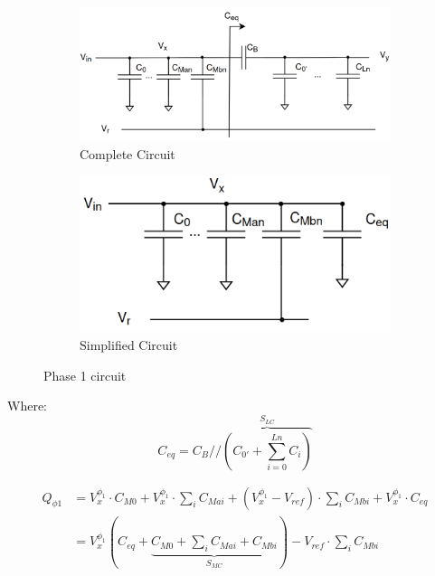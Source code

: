 \begin{figure}[H]

    \centering
    \begin{subfigure}{0.4\textwidth}
        \includegraphics*[scale = 0.17]{Images/DACCircP1.png}
        \caption{Complete Circuit}
        \label{fig:first}
    \end{subfigure}
    \hfill
    \begin{subfigure}{0.4\textwidth}
        \includegraphics*[scale = 0.18]{Images/DACP1Ceq.png}
        \caption{Simplified Circuit}
        \label{fig:second}
    \end{subfigure}
    
    \caption{Phase 1 circuit}
    \label{fig:P1_Circ}
\end{figure}

Where:
\begin{equation}
    C_{eq} = C_B // \overbrace{\left( C_{0'}+\sum_{i=0}^{Ln} C_i\right )}^{S_{LC}}
\end{equation}

\begin{equation}
    \begin{split}
        Q_{\phi 1} &= V_x^{\phi_1}\cdot C_{M0}+ V_x^{\phi_1}\cdot  \sum_i C_{Mai} + (V_x^{\phi_1} - V_{ref})\cdot  \sum_i C_{Mbi}+ V_x^{\phi_1}\cdot C_{eq} \\
        &= V_x^{\phi_1} \left( C_{eq} +\underbrace{ C_{M0} +   \sum_i C_{Mai}+C_{Mbi}}_{S_{MC}} \right ) - V_{ref}\cdot \sum_i C_{Mbi}
    \end{split}
    \label{eq:ChargeP1}
\end{equation}


